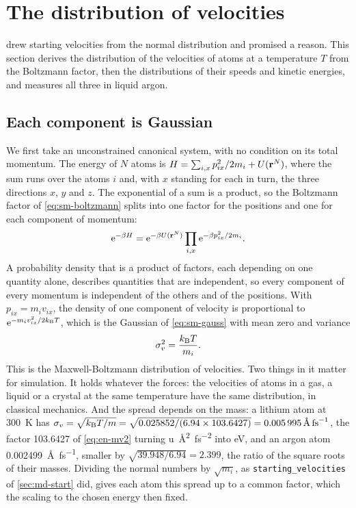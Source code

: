 \section{The distribution of velocities}
\label{sec:sm-maxwell}

 drew starting velocities from the normal distribution
and promised a reason. This section derives the distribution of the
velocities of atoms at a temperature $T$ from the Boltzmann factor, then
the distributions of their speeds and kinetic energies, and measures all
three in liquid argon.

\subsection*{Each component is Gaussian}

We first take an unconstrained canonical system, with no condition on its
total momentum. The energy of $N$ atoms is $H = \sum_{i,x}p_{ix}^2/2m_i + U(\bm{\mathrm{r}}^N)$,
where the sum runs over the atoms $i$ and, with $x$ standing for each in
turn, the three directions $x$, $y$ and $z$. The
exponential of a sum is a product, so the Boltzmann factor of
\cref{eq:sm-boltzmann} splits into one factor for the positions and one
for each component of momentum:
\begin{equation*}
   \mathrm{e}^{-\beta H} = \mathrm{e}^{-\beta U(\bm{\mathrm{r}}^N)}\prod_{i,x}
   \mathrm{e}^{-\beta p_{ix}^2/2m_i} .
\end{equation*}
A probability density that is a product of factors, each depending on
one quantity alone, describes quantities that are independent, so every
component of every momentum is independent of the others and of the
positions. With $p_{ix} = m_iv_{ix}$, the density of one component of
velocity is proportional to $\mathrm{e}^{-m_iv_{ix}^2/2k_{\mathrm{B}} T}$, which is
the Gaussian of \cref{eq:sm-gauss} with mean zero and variance
\begin{equation}
   \sigma_v^2 = \frac{k_{\mathrm{B}} T}{m_i} .
   \label{eq:sm-maxwell}
\end{equation}
This is the Maxwell-Boltzmann distribution of velocities. Two things in it
matter for simulation. It holds whatever the forces: the velocities of
atoms in a gas, a liquid or a crystal at the same temperature have the
same distribution, in classical mechanics. And the spread depends on the
mass: a lithium atom at \SI{300}{\kelvin} has $\sigma_v = \sqrt{\kB T/m} =
\sqrt{0.025852/(6.94\times103.6427)} =
\SI{0.005995}{\angstrom\per\femto\second}$, the factor 103.6427 of
\cref{eq:en-mv2} turning \si{\amu\angstrom\squared\per\femto\second\squared}
into \si{\electronvolt}, and an argon atom
\SI{0.002499}{\angstrom\per\femto\second}, smaller by $\sqrt{39.948/6.94}
= 2.399$, the ratio of the square roots of their masses. Dividing the normal numbers by
$\sqrt{m_i}$, as \texttt{starting\_velocities} of \cref{sec:md-start}
did, gives each atom this spread up to a common factor, which the
scaling to the chosen energy then fixed.

